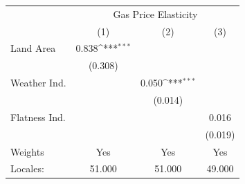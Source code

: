 {
\def\sym#1{\ifmmode^{#1}\else\(^{#1}\)\fi}
\begin{tabular}{l*{3}{c}}
\hline\hline
            &\multicolumn{3}{c}{Gas Price Elasticity}                         \\
            &\multicolumn{1}{c}{(1)}         &\multicolumn{1}{c}{(2)}         &\multicolumn{1}{c}{(3)}         \\
\hline
Land Area   &       0.838\sym{***}&                     &                     \\
            &     (0.308)         &                     &                     \\
[1em]
Weather Ind.&                     &       0.050\sym{***}&                     \\
            &                     &     (0.014)         &                     \\
[1em]
Flatness Ind.&                     &                     &       0.016         \\
            &                     &                     &     (0.019)         \\
\hline
Weights     &         Yes         &         Yes         &         Yes         \\
Locales:    &      51.000         &      51.000         &      49.000         \\
\hline\hline
\end{tabular}
}
